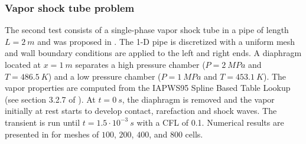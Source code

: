 \documentclass{inputs/mc2015}
\begin{document}
\subsubsection{Vapor shock tube problem} \label{sec:vap-1-phase-shock-tube}
%
The second test consists of a single-phase vapor shock tube in a pipe of length $L=2 \ m$ and was proposed in \cite{waha-manual, Sokolowski-Koszela}. The 1-D pipe is discretized with a uniform mesh and wall boundary conditions are applied to the left and right ends. A diaphragm located at $x=1 \ m$ separates a high pressure chamber ($P=2 \ MPa$ and $T=486.5 \ K$) and a low pressure chamber ($P=1 \ MPa$ and $T=453.1 \ K$). The vapor properties are computed from the IAPWS95 Spline Based Table Lookup (see section 3.2.7 of \cite{Berry_Peterson_2014}). At $t=0 \ s$, the diaphragm is removed and the vapor initially at rest starts to develop contact, rarefaction and shock waves. The transient is run until $t=1.5 \cdot 10^{-3} \ s$ with a CFL of 0.1. Numerical results are presented in  for meshes of $100$, $200$, $400$, and $800$ cells.
%
\end{document}
